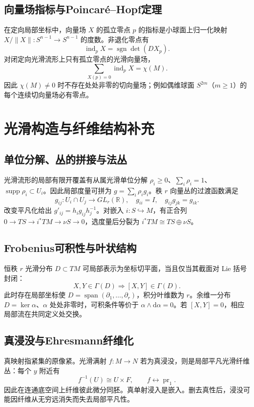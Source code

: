 \documentclass[../main.tex]{subfiles}
\begin{document}
\subsection{向量场指标与Poincaré--Hopf定理}
在定向局部坐标中，向量场 $X$ 的孤立零点 $p$ 的指标是小球面上归一化映射 $X/\|X\|:S^{n-1}\to S^{n-1}$ 的度数。非退化零点有
\[
\operatorname{ind}_pX=\operatorname{sgn}\det(DX_p).
\]
对闭定向光滑流形上只有孤立零点的光滑向量场，
\[
\sum_{X(p)=0}\operatorname{ind}_pX=\chi(M).
\]
因此 $\chi(M)\ne0$ 时不存在处处非零的切向量场；例如偶维球面 $S^{2m}$（$m\ge1$）的每个连续切向量场必有零点。
\section{光滑构造与纤维结构补充}
\subsection{单位分解、丛的拼接与法丛}
光滑流形的局部有限开覆盖有从属光滑单位分解 $\rho_i\ge0$、$\sum_i\rho_i=1$、$\operatorname{supp}\rho_i\subset U_i$。因此局部度量可拼为 $g=\sum_i\rho_ig_i$。秩 $r$ 向量丛的过渡函数满足
\[
g_{ij}:U_i\cap U_j\to GL_r(\mathbb R),\quad g_{ii}=I,\quad
g_{ij}g_{jk}=g_{ik}.
\]
改变平凡化给出 $g'_{ij}=h_ig_{ij}h_j^{-1}$。对嵌入 $i:S\hookrightarrow M$，有正合列 $0\to TS\to i^*TM\to\nu S\to0$，选度量后分裂为 $i^*TM\cong TS\oplus\nu S$。
\subsection{Frobenius可积性与叶状结构}
恒秩 $r$ 光滑分布 $D\subset TM$ 可局部表示为坐标切平面，当且仅当其截面对 Lie 括号封闭：
\[
X,Y\in\Gamma(D)\Longrightarrow[X,Y]\in\Gamma(D).
\]
此时存在局部坐标使 $D=\operatorname{span}(\partial_1,\ldots,\partial_r)$，积分叶维数为 $r$。余维一分布 $D=\ker\alpha$、$\alpha$ 处处非零时，可积条件等价于 $\alpha\wedge\mathrm d\alpha=0$。若 $[X,Y]=0$，相应局部流在共同定义处交换。
\subsection{真浸没与Ehresmann纤维化}
真映射指紧集的原像紧。光滑满射 $f:M\to N$ 若为真浸没，则是局部平凡光滑纤维丛：每个 $y$ 附近有
\[
f^{-1}(U)\cong U\times F,\qquad f\leftrightarrow\operatorname{pr}_1.
\]
因此在连通底空间上纤维彼此微分同胚。真单射浸入是嵌入。删去真性后，浸没可能因纤维从无穷远消失而失去局部平凡性。
\end{document}

